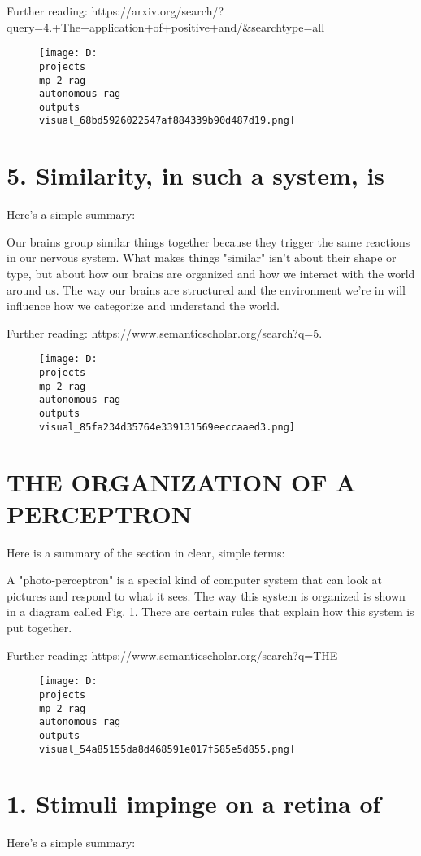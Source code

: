\documentclass[12pt,a4paper]{article}
\begin{document}
Further reading: https://arxiv.org/search/?query=4.+The+application+of+positive+and/&searchtype=all
\begin{figure}[h]
\centering
\texttt{[image: D:\\projects\\mp 2 rag\\autonomous rag\\outputs\\visual\_68bd5926022547af884339b90d487d19.png]}
\end{figure}
\section{5. Similarity, in such a system, is}
Here's a simple summary:

Our brains group similar things together because they trigger the same reactions in our nervous system. What makes things "similar" isn't about their shape or type, but about how our brains are organized and how we interact with the world around us. The way our brains are structured and the environment we're in will influence how we categorize and understand the world.

Further reading: https://www.semanticscholar.org/search?q=5.%
\begin{figure}[h]
\centering
\texttt{[image: D:\\projects\\mp 2 rag\\autonomous rag\\outputs\\visual\_85fa234d35764e339131569eeccaaed3.png]}
\end{figure}
\section{THE ORGANIZATION OF A PERCEPTRON}
Here is a summary of the section in clear, simple terms:

A "photo-perceptron" is a special kind of computer system that can look at pictures and respond to what it sees. The way this system is organized is shown in a diagram called Fig. 1. There are certain rules that explain how this system is put together.

Further reading: https://www.semanticscholar.org/search?q=THE%
\begin{figure}[h]
\centering
\texttt{[image: D:\\projects\\mp 2 rag\\autonomous rag\\outputs\\visual\_54a85155da8d468591e017f585e5d855.png]}
\end{figure}
\section{1. Stimuli impinge on a retina of}
Here's a simple summary:
\end{document}
